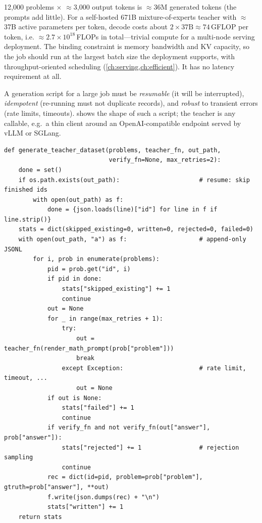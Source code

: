 \begin{napkinmath}
12{,}000 problems $\times$ $\approx$3{,}000 output tokens is $\approx 36$M generated tokens (the
prompts add little). For a self-hosted 671B mixture-of-experts teacher with $\approx$37B active
parameters per token, decode costs about $2\times 37\text{B} \approx 74$\,GFLOP per token, i.e.
$\approx 2.7\times10^{18}$\,FLOPs in total---trivial compute for a multi-node serving deployment.
The binding constraint is memory bandwidth and KV capacity, so the job should run at the
largest batch size the deployment supports, with throughput-oriented scheduling
(\cref{ch:serving,ch:efficient}). It has no latency requirement at all.
\end{napkinmath}

A generation script for a large job must be \emph{resumable} (it will be interrupted),
\emph{idempotent} (re-running must not duplicate records), and \emph{robust} to transient
errors (rate limits, timeouts).  shows the shape of such a script; the
teacher is any callable, e.g.\ a thin client around an OpenAI-compatible endpoint served by
vLLM or SGLang.

\begin{lstlisting}[caption={Resumable, verifiable teacher-trace generation
(\texttt{llmsys/distill.py}).},label={lst:distill:gen}]
def generate_teacher_dataset(problems, teacher_fn, out_path,
                             verify_fn=None, max_retries=2):
    done = set()
    if os.path.exists(out_path):                      # resume: skip finished ids
        with open(out_path) as f:
            done = {json.loads(line)["id"] for line in f if line.strip()}
    stats = dict(skipped_existing=0, written=0, rejected=0, failed=0)
    with open(out_path, "a") as f:                    # append-only JSONL
        for i, prob in enumerate(problems):
            pid = prob.get("id", i)
            if pid in done:
                stats["skipped_existing"] += 1
                continue
            out = None
            for _ in range(max_retries + 1):
                try:
                    out = teacher_fn(render_math_prompt(prob["problem"]))
                    break
                except Exception:                     # rate limit, timeout, ...
                    out = None
            if out is None:
                stats["failed"] += 1
                continue
            if verify_fn and not verify_fn(out["answer"], prob["answer"]):
                stats["rejected"] += 1                # rejection sampling
                continue
            rec = dict(id=pid, problem=prob["problem"], gtruth=prob["answer"], **out)
            f.write(json.dumps(rec) + "\n")
            stats["written"] += 1
    return stats
\end{lstlisting}

